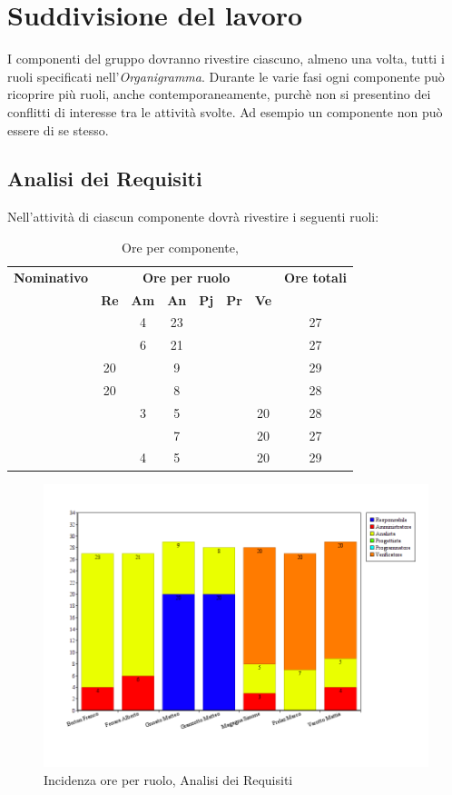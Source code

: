 \section{Suddivisione del lavoro}
I componenti del gruppo dovranno rivestire ciascuno, almeno una volta, tutti i ruoli specificati nell'\textit{Organigramma}.
Durante le varie fasi ogni componente può ricoprire più ruoli, anche contemporaneamente, purchè non si presentino dei conflitti di interesse tra le attività svolte. Ad esempio un componente non può essere \textit{\Ver} di se stesso.
\subsection{Analisi dei Requisiti}
Nell'attività di \textit{\AdR} ciascun componente dovrà rivestire i seguenti ruoli:
\begin{table}[H]
	\begin{center}
		\begin{tabular}{|c|c|c|c|c|c|c|c|}
			\hline
			\textbf{Nominativo} & \multicolumn{6}{c|}{\textbf{Ore per ruolo}} & \textbf{Ore totali} \\
			& \textbf{Re} & \textbf{Am} & \textbf{An} & \textbf{Pj} & \textbf{Pr} & \textbf{Ve} & \\
			\hline
			\FB	&		&	4	&	23	&		&		&		&	27	\\
			\hline
			\AF		&		&	6	&	21	&	 	&		&		& 	27	\\
			\hline
			\GN		&	20	&		&	9	&		&		&		&	29	\\
			\hline						
			\GR	&	20	&	 	&	8 	&		&	 	& 		&	28	\\
			\hline
			\SM 		&		&	3	&	5	&		&		& 	20	&	28	\\
			\hline
			\MP		& 		&		&	7	&		&		&	20	&	27	\\
			\hline						
			\MV 		&		&	4	&	5	&		&		&	20	& 	29	\\
			\hline
		\end{tabular}
	\end{center}
	\caption{Ore per componente, \AdR}
\end{table}

\begin{figure}[H]
	\centering
	\includegraphics[scale=0.4]{immagini/Grafi/GrafoAR}
	\caption{Incidenza ore per ruolo, Analisi dei Requisiti}
\end{figure}

